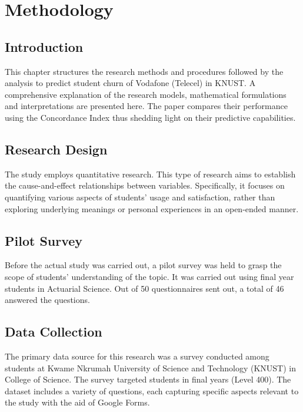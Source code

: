 \documentclass[doublespacing,12pt]{report}
\begin{document}
\newpage
\chapter{Methodology}

\section{Introduction}

This chapter structures the research methods and procedures followed by the analysis to predict student churn of Vodafone (Telecel) in KNUST. A comprehensive explanation of the research models, mathematical formulations and interpretations are presented here. The paper compares their performance using the Concordance Index thus shedding light on their predictive capabilities.

\section{Research Design}

The study employs quantitative research. This type of research aims to establish the cause-and-effect relationships between variables. Specifically, it focuses on quantifying various aspects of students’ usage and satisfaction, rather than exploring underlying meanings or personal experiences in an open-ended manner.

\section{Pilot Survey}

Before the actual study was carried out, a pilot survey was held to grasp the scope of students’ understanding of the topic. It was carried out using final year students in Actuarial Science. Out of 50 questionnaires sent out, a total of 46 answered the questions.
\section{Data Collection}

The primary data source for this research was a survey conducted among students at Kwame Nkrumah University of Science and Technology (KNUST) in College of Science. The survey targeted students in final years (Level 400). The dataset includes a variety of questions, each capturing specific aspects relevant to the study with the aid of Google Forms.
\end{document}
